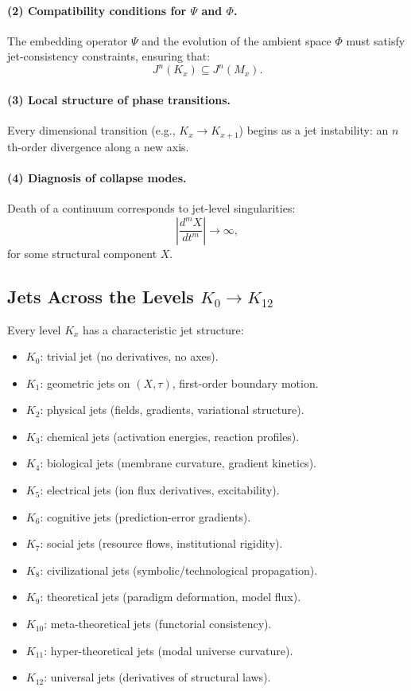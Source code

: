 \paragraph{(2) Compatibility conditions for \texorpdfstring{$\Psi$}{\Psi} and \texorpdfstring{$\Phi$}{\Phi}.}
The embedding operator $\Psi$ and the evolution of the ambient space
$\Phi$ must satisfy jet-consistency constraints, ensuring that:
\[
J^n(K_x) \subseteq J^n(M_x).
\]

\paragraph{(3) Local structure of phase transitions.}
Every dimensional transition (e.g., $K_{x} \to K_{x+1}$) begins as a
jet instability: an $n$th-order divergence along a new axis.

\paragraph{(4) Diagnosis of collapse modes.}
Death of a continuum corresponds to jet-level singularities:
\[
\left| \frac{d^m X}{dt^m} \right| \to \infty,
\]
for some structural component $X$.



\subsection{Jets Across the Levels $K_0 \to K_{12}$}

Every level $K_x$ has a characteristic jet structure:

\begin{itemize}
    \item $K_0$: trivial jet (no derivatives, no axes).
    \item $K_1$: geometric jets on $(X,\tau)$, first-order boundary motion.
    \item $K_2$: physical jets (fields, gradients, variational structure).
    \item $K_3$: chemical jets (activation energies, reaction profiles).
    \item $K_4$: biological jets (membrane curvature, gradient kinetics).
    \item $K_5$: electrical jets (ion flux derivatives, excitability).
    \item $K_6$: cognitive jets (prediction-error gradients).
    \item $K_7$: social jets (resource flows, institutional rigidity).
    \item $K_8$: civilizational jets (symbolic/technological propagation).
    \item $K_9$: theoretical jets (paradigm deformation, model flux).
    \item $K_{10}$: meta-theoretical jets (functorial consistency).
    \item $K_{11}$: hyper-theoretical jets (modal universe curvature).
    \item $K_{12}$: universal jets (derivatives of structural laws).
\end{itemize}

